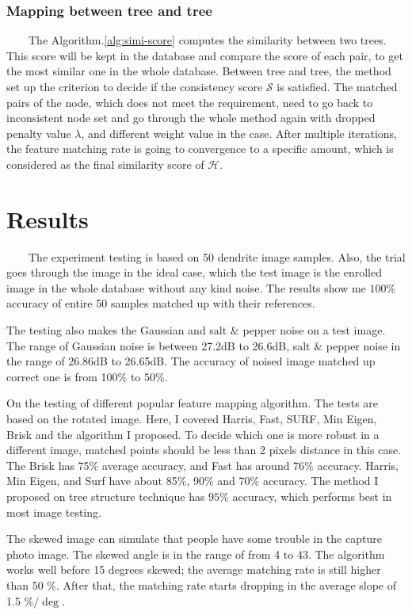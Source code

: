 \documentclass[]{article}   %
\begin{document}
 \subsubsection{Mapping between tree and tree}
 \ \ \ \ The Algorithm.\ref{alg:simi-score} computes the similarity between two trees. This score will be kept in the database and compare the score of each pair, to get the most similar one in the whole database. Between tree and tree, the method set up the criterion to decide if the consistency score $\mathcal{S}$ is satisfied. The matched pairs of the node, which does not meet the requirement, need to go back to inconsistent node set and go through the whole method again with dropped penalty value $\lambda$, and different weight value in the case. After multiple iterations, the feature matching rate is going to convergence to a specific amount, which is considered as the final similarity score of $\mathcal{H}$.  

 
 \section{Results}
\ \ \ \ The experiment testing is based on 50 dendrite image samples. Also, the trial goes through the image in the ideal case, which the test image is the enrolled image in the whole database without any kind noise. The results show me $ 100\% $ accuracy of entire 50 samples matched up with their references. 

The testing also makes the Gaussian and salt $\&$ pepper noise on a test image. The range of Gaussian noise is between 27.2dB to 26.6dB, salt $\&$ pepper noise in the range of 26.86dB to 26.65dB. The accuracy of noised image matched up correct one is from 100$\%$ to $50\%$. 

On the testing of different popular feature mapping algorithm. The tests are based on the rotated image. Here, I covered Harris, Fast, SURF, Min Eigen, Brisk and the algorithm I proposed. To decide which one is more robust in a different image, matched points should be less than 2 pixels distance in this case. The Brisk has 75$\%$ average accuracy, and Fast has around 76$\%$ accuracy. Harris, Min Eigen, and Surf have about 85$\%$, 90$\%$ and 70$\%$ accuracy. The method I proposed on tree structure technique has $95\%$ accuracy, which performs best in most image testing. 

The skewed image can simulate that people have some trouble in the capture photo image. The skewed angle is in the range of from 4 to 43. The algorithm works well before 15 degrees skewed; the average matching rate is still higher than 50 $\%$. After that, the matching rate starts dropping in the average slope of 1.5 $\%/\deg$.
\end{document}
